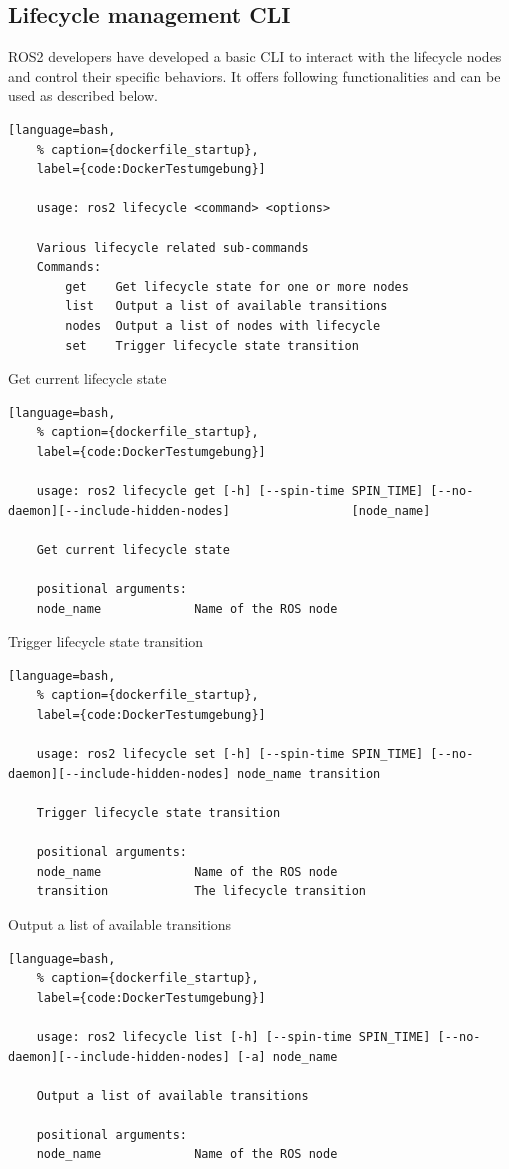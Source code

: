 \subsection{Lifecycle management CLI}
\label{Lifecycle management CLI}
 ROS2 developers have developed a basic CLI to interact with the lifecycle nodes and control their specific behaviors. 
It offers following functionalities and can be used as described below.
\begin{lstlisting}[language=bash,
	% caption={dockerfile_startup}, 
	label={code:DockerTestumgebung}]
	
	usage: ros2 lifecycle <command> <options>

	Various lifecycle related sub-commands
	Commands:
		get    Get lifecycle state for one or more nodes
		list   Output a list of available transitions
		nodes  Output a list of nodes with lifecycle
		set    Trigger lifecycle state transition
\end{lstlisting}

Get current lifecycle state
\begin{lstlisting}[language=bash,
	% caption={dockerfile_startup}, 
	label={code:DockerTestumgebung}]
	
	usage: ros2 lifecycle get [-h] [--spin-time SPIN_TIME] [--no-daemon][--include-hidden-nodes]                 [node_name]

	Get current lifecycle state
	
	positional arguments:
	node_name             Name of the ROS node
\end{lstlisting}

Trigger lifecycle state transition
\begin{lstlisting}[language=bash,
	% caption={dockerfile_startup}, 
	label={code:DockerTestumgebung}]
	
	usage: ros2 lifecycle set [-h] [--spin-time SPIN_TIME] [--no-daemon][--include-hidden-nodes] node_name transition

	Trigger lifecycle state transition

	positional arguments:
	node_name             Name of the ROS node
	transition            The lifecycle transition
\end{lstlisting}

Output a list of available transitions
\begin{lstlisting}[language=bash,
	% caption={dockerfile_startup}, 
	label={code:DockerTestumgebung}]
	
	usage: ros2 lifecycle list [-h] [--spin-time SPIN_TIME] [--no-daemon][--include-hidden-nodes] [-a] node_name

	Output a list of available transitions

	positional arguments:
	node_name             Name of the ROS node
	
\end{lstlisting}

